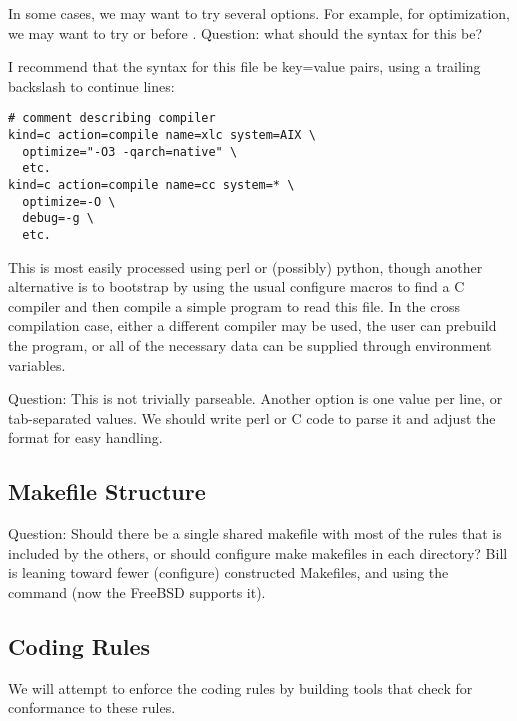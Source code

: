 \documentclass{article}
\begin{document}
In some cases, we may want to try several options.  For example, for
optimization, we may want to try  or  before .
Question:
what should the syntax for this be?

I recommend that the syntax for this file be key=value pairs, using a
trailing backslash to continue lines:
\begin{verbatim}
# comment describing compiler
kind=c action=compile name=xlc system=AIX \
  optimize="-O3 -qarch=native" \
  etc.
kind=c action=compile name=cc system=* \
  optimize=-O \
  debug=-g \
  etc.
\end{verbatim}
This is most easily processed using perl or (possibly) python, though
another alternative is to bootstrap by using the usual configure
macros to find a C compiler and then compile a simple program to read
this file.  In the cross compilation case, either a different compiler
may be used, the user can prebuild the program, or all of the
necessary data can be supplied through environment variables.

Question: This is not trivially parseable.  Another option is one value per
line, or tab-separated values.  We should write perl or C code to parse it and
adjust the format for easy handling.

\subsection{Makefile Structure}
\label{sec:makefiles}
Question: Should there be a single shared makefile with most of the rules that
is included by the others, or should configure make makefiles in each
directory?  Bill is leaning toward fewer (configure) constructed Makefiles,
and using the \code{include} command (now the FreeBSD supports it).

\subsection{Coding Rules}
We will attempt to enforce the coding rules by building tools that
check for conformance to these rules.
\end{document}
